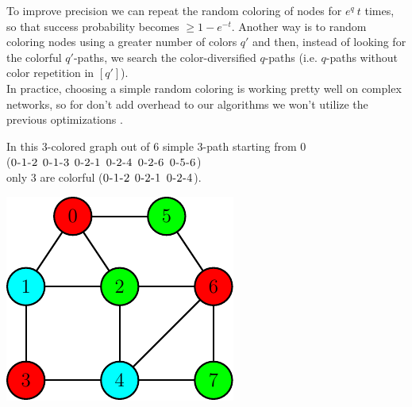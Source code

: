 To improve precision we can repeat the random coloring of nodes for $e^{q}\ t$ times, 
so that success probability becomes $\geq 1-e^{-t}$. 
Another way is to random coloring nodes using a greater number of colors $q'$ and then, instead of looking for the colorful $q'$-paths,
we search the color-diversified $q$-paths (i.e. $q$-paths without color repetition in $[q']$)\cite{deshpande2007randomized}.\\

In practice, choosing a simple random coloring is working pretty well on complex networks, 
so for don't add overhead to our algorithms we won't utilize the previous optimizations .\\


	\begin{minipage}{0.55\textwidth}\raggedright
		\begin{esempio}
		\end{esempio}
		
		In this $3$-colored graph out of $6$ simple $3$-path starting from $0$\\
		($\textsc{0-1-2}$ $\textsc{0-1-3}$ $\textsc{0-2-1}$ $\textsc{0-2-4}$ $\textsc{0-2-6}$ $\textsc{0-5-6}$)\\ 
		only $3$ are colorful ($\textsc{0-1-2}$ $\textsc{0-2-1}$ $\textsc{0-2-4}$).
	\end{minipage}
	\begin{minipage}{0.35\textwidth}
		\includegraphics[width=\linewidth]{figure/figure-2-6}
	\end{minipage}

\noindent
\\

\clearpage
